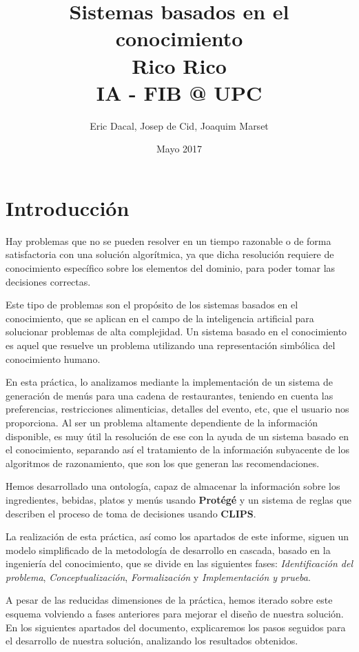 \documentclass{article}
\title{%
  Sistemas basados en el conocimiento \\
  \large Rico Rico \\
  IA - FIB @ UPC
}
\author{\large Eric Dacal, Josep de Cid, Joaquim Marset}
\date{Mayo 2017}
\newenvironment{bottompar}{\par\vspace*{\fill}}{\clearpage}
\begin{document}
\maketitle
\begin{bottompar}
\tableofcontents
\end{bottompar}

\newpage
\section{Introducción}
Hay problemas que no se pueden resolver en un tiempo razonable o de forma satisfactoria con una solución algorítmica, ya que dicha resolución requiere de conocimiento específico sobre los elementos del dominio, para poder tomar las decisiones correctas.
\par
Este tipo de problemas son el propósito de los sistemas basados en el conocimiento, que se aplican en el campo de la inteligencia artificial para solucionar problemas de alta complejidad. Un sistema basado en el conocimiento es aquel que resuelve un problema utilizando una representación simbólica del conocimiento humano.
\par
En esta práctica, lo analizamos mediante la implementación de un sistema de generación de menús para una cadena de restaurantes, teniendo en cuenta las preferencias, restricciones alimenticias, detalles del evento, etc, que el usuario nos proporciona. Al ser un problema altamente dependiente de la información disponible, es muy útil la resolución de ese con la ayuda de un sistema basado en el conocimiento, separando así el tratamiento de la información subyacente de los algoritmos de razonamiento, que son los que generan las recomendaciones.
\par
Hemos desarrollado una ontología, capaz de almacenar la información sobre los ingredientes, bebidas, platos y menús usando \textbf{Protégé} y un sistema de reglas que describen el proceso de toma de decisiones usando \textbf{CLIPS}.
\par
La realización de esta práctica, así como los apartados de este informe, siguen un modelo simplificado de la metodología de desarrollo en cascada, basado en la ingeniería del conocimiento, que se divide en las siguientes fases: \textit{Identificación del problema}, \textit{Conceptualización}, \textit{Formalización} y  \textit{Implementación y prueba}.
\par
A pesar de las reducidas dimensiones de la práctica, hemos iterado sobre este esquema volviendo a fases anteriores para mejorar el diseño de nuestra solución. En los siguientes apartados del documento, explicaremos los pasos seguidos para el desarrollo de nuestra solución, analizando los resultados obtenidos.
\end{document}
